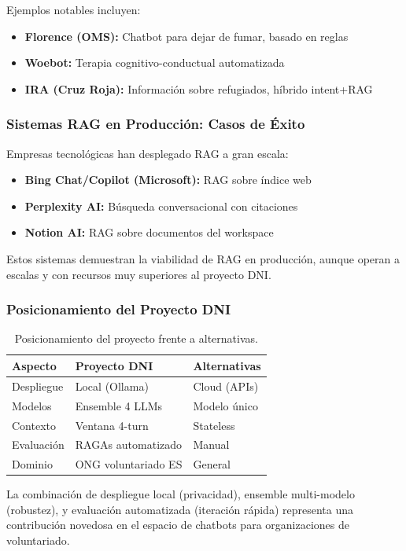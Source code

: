 Ejemplos notables incluyen:
\begin{itemize}
    \item \textbf{Florence (OMS):} Chatbot para dejar de fumar, basado en reglas
    \item \textbf{Woebot:} Terapia cognitivo-conductual automatizada
    \item \textbf{IRA (Cruz Roja):} Informaci\'on sobre refugiados, h\'ibrido intent+RAG
\end{itemize}

\subsubsection{Sistemas RAG en Producci\'on: Casos de \'Exito}
\label{subsubsec:rag-produccion}

Empresas tecnol\'ogicas han desplegado RAG a gran escala:
\begin{itemize}
    \item \textbf{Bing Chat/Copilot (Microsoft):} RAG sobre \'indice web
    \item \textbf{Perplexity AI:} B\'usqueda conversacional con citaciones
    \item \textbf{Notion AI:} RAG sobre documentos del workspace
\end{itemize}

Estos sistemas demuestran la viabilidad de RAG en producci\'on, aunque operan a escalas y con recursos muy superiores al proyecto DNI.

\subsubsection{Posicionamiento del Proyecto DNI}
\label{subsubsec:posicionamiento}

\begin{table}[H]
\centering
\caption{Posicionamiento del proyecto frente a alternativas.}
\label{tab:posicionamiento}
\begin{tabular}{@{}lll@{}}
\toprule
\textbf{Aspecto} & \textbf{Proyecto DNI} & \textbf{Alternativas} \\
\midrule
Despliegue & Local (Ollama) & Cloud (APIs) \\
Modelos & Ensemble 4 LLMs & Modelo \'unico \\
Contexto & Ventana 4-turn & Stateless \\
Evaluaci\'on & RAGAs automatizado & Manual \\
Dominio & ONG voluntariado ES & General \\
\bottomrule
\end{tabular}
\end{table}

La combinaci\'on de despliegue local (privacidad), ensemble multi-modelo (robustez), y evaluaci\'on automatizada (iteraci\'on r\'apida) representa una contribuci\'on novedosa en el espacio de chatbots para organizaciones de voluntariado.
